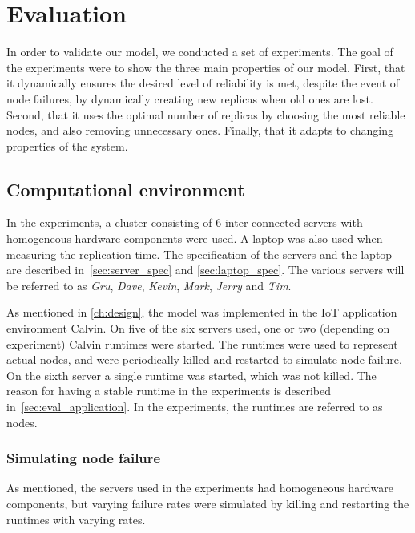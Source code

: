 \documentclass{cslthse-msc}
\begin{document}
\chapter{Evaluation} \label{ch:evaluation}
In order to validate our model, we conducted a set of experiments. The goal of the experiments were to show the three main properties of our model. First, that it dynamically ensures the desired level of reliability is met, despite the event of node failures, by dynamically creating new replicas when old ones are lost. Second, that it uses the optimal number of replicas by choosing the most reliable nodes, and also removing unnecessary ones. Finally, that it adapts to changing properties of the system.

\section{Computational environment} \label{sec:eval_comp_env}
In the experiments, a cluster consisting of 6 inter-connected servers with homogeneous hardware components were used. A laptop was also used when measuring the replication time. The specification of the servers and the laptop are described in~\cref{sec:server_spec} and \cref{sec:laptop_spec}. The various servers will be referred to as \emph{Gru}, \emph{Dave}, \emph{Kevin}, \emph{Mark}, \emph{Jerry} and \emph{Tim}.

As mentioned in \cref{ch:design}, the model was implemented in the IoT application environment Calvin. On five of the six servers used, one or two (depending on experiment) Calvin runtimes were started. The runtimes were used to represent actual nodes, and were periodically killed and restarted to simulate node failure. On the sixth server a single runtime was started, which was not killed. The reason for having a stable runtime in the experiments is described in~\cref{sec:eval_application}. In the experiments, the runtimes are referred to as nodes.

\subsection{Simulating node failure} \label{sec:simulating_node_failure}
As mentioned, the servers used in the experiments had homogeneous hardware components, but varying failure rates were simulated by killing and restarting the runtimes with varying rates.
\end{document}
